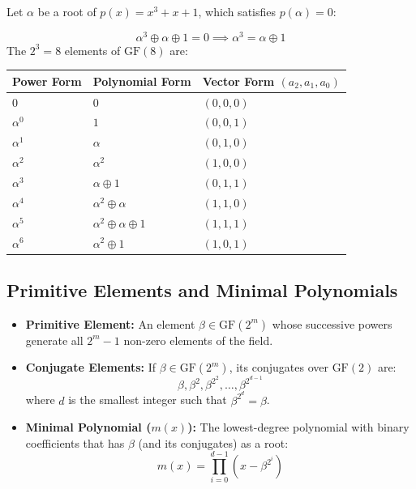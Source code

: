 \documentclass[12pt,a4paper]{article}
\renewcommand{\arraystretch}{1.45}
\begin{document}
\begin{tcolorbox}[examplebox, title={\textbf{Construction of GF($2^3$) using $p(x) = x^3 + x + 1$}}]
Let $\alpha$ be a root of $p(x) = x^3 + x + 1$, which satisfies $p(\alpha) = 0$:\par
\[
\alpha^3 \oplus \alpha \oplus 1 = 0 \implies \alpha^3 = \alpha \oplus 1
\]
The $2^3 = 8$ elements of $\text{GF}(8)$ are:
\par\noindent
\renewcommand{\arraystretch}{1.2}
\begin{tabularx}{\linewidth}{|>{\centering\arraybackslash}X|>{\centering\arraybackslash}X|>{\centering\arraybackslash}X|}
\hline
\textbf{Power Form} & \textbf{Polynomial Form} & \textbf{Vector Form $(a_2, a_1, a_0)$} \\
\hline
$0$ & $0$ & $(0, 0, 0)$ \\
\hline
$\alpha^0$ & $1$ & $(0, 0, 1)$ \\
\hline
$\alpha^1$ & $\alpha$ & $(0, 1, 0)$ \\
\hline
$\alpha^2$ & $\alpha^2$ & $(1, 0, 0)$ \\
\hline
$\alpha^3$ & $\alpha \oplus 1$ & $(0, 1, 1)$ \\
\hline
$\alpha^4$ & $\alpha^2 \oplus \alpha$ & $(1, 1, 0)$ \\
\hline
$\alpha^5$ & $\alpha^2 \oplus \alpha \oplus 1$ & $(1, 1, 1)$ \\
\hline
$\alpha^6$ & $\alpha^2 \oplus 1$ & $(1, 0, 1)$ \\
\hline
\end{tabularx}
\end{tcolorbox}

\subsection{Primitive Elements and Minimal Polynomials}
\begin{itemize}[leftmargin=*, itemsep=3pt]
  \item \textbf{Primitive Element:} An element $\beta \in \text{GF}(2^m)$ whose successive powers generate all $2^m-1$ non-zero elements of the field.
  \item \textbf{Conjugate Elements:} If $\beta \in \text{GF}(2^m)$, its conjugates over $\text{GF}(2)$ are:
    \[ \beta, \beta^2, \beta^{2^2}, \dots, \beta^{2^{d-1}} \]
    where $d$ is the smallest integer such that $\beta^{2^d} = \beta$.
  \item \textbf{Minimal Polynomial ($m(x)$):} The lowest-degree polynomial with binary coefficients that has $\beta$ (and its conjugates) as a root:
    \[ m(x) = \prod_{i=0}^{d-1} (x - \beta^{2^i}) \]
\end{itemize}
\end{document}
